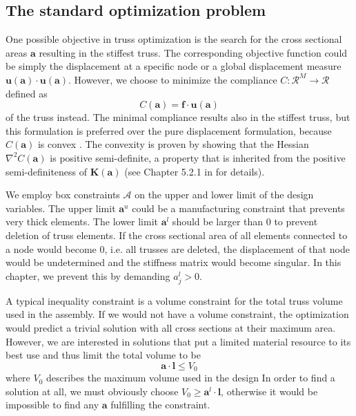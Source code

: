 \subsection{The standard optimization problem}
\label{sec:standard_truss_problem}
One possible objective in truss optimization is the search for the cross sectional areas $\mathbf{a}$ resulting in the stiffest truss. The corresponding objective function could be simply the displacement at a specific node or a global displacement measure $\mathbf{u} (\mathbf{a}) \cdot \mathbf{u} (\mathbf{a})$. However, we choose to minimize the compliance $C: \mathcal{R}^{M} \rightarrow \mathcal{R}$ defined as 
\begin{equation}
    C(\mathbf{a}) = \mathbf{f} \cdot \mathbf{u}(\mathbf{a})
\end{equation} 
of the truss instead. The minimal compliance results also in the stiffest truss, but this formulation is preferred over the pure displacement formulation, because $C(\mathbf{a})$ is convex \cite{Svanberg1984}. The convexity is proven by showing that the Hessian $\nabla^2 C(\mathbf{a})$ is positive semi-definite, a property that is inherited from the positive semi-definiteness of $\mathbf{K}(\mathbf{a})$ (see Chapter 5.2.1 in \cite{Christensen2008} for details).

We employ box constraints $\mathcal{A}$ on the upper and lower limit of the design variables. The upper limit $\mathbf{a}^u$ could be a manufacturing constraint that prevents very thick elements. The lower limit $\mathbf{a}^l$ should be larger than $0$ to prevent deletion of truss elements. If the cross sectional area of all elements connected to a node would become $0$, i.e. all trusses are deleted, the displacement of that node would be undetermined and the stiffness matrix would become singular. In this chapter, we prevent this by demanding $a_j^l > 0$.

A typical inequality constraint is a volume constraint for the total truss volume used in the assembly. If we would not have a volume constraint, the optimization would predict a trivial solution with all cross sections at their maximum area. However, we are interested in solutions that put a limited material resource to its best use and thus limit the total volume to be 
\begin{equation}
    \mathbf{a} \cdot \mathbf{l} \le V_0
\end{equation}
where $V_0$ describes the maximum volume used in the design
In order to find a solution at all, we must obviously choose $V_0 \ge \mathbf{a}^l \cdot \mathbf{l}$, otherwise it would be impossible to find any $\mathbf{a}$ fulfilling the constraint. 

